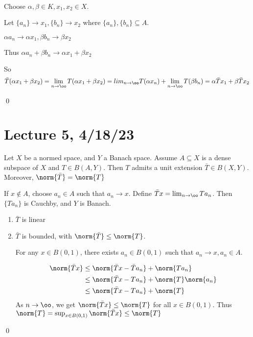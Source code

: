 \documentclass[x11names,reqno,14pt]{extarticle}
\begin{document}
\,

Choose $\alpha,\beta \in K, x_1, x_2 \in X$. 

Let $\{a_n\}\to x_1, \{b_n\}\to x_2$ where $\{a_n\},\{b_n\}\subseteq A$. 

$\alpha a_n \to \alpha x_1, \beta b_n \to \beta x_2$

Thus $\alpha a_n + \beta b_n \to \alpha x_1 + \beta x_2$

So
\[
\bar{T}(\alpha x_1 + \beta x_2) = \lim_{n\to\oo}T(\alpha x_1 + \beta x_2) = lim_{n\to\oo}T(\alpha x_n) + \lim_{n\to\oo}T(\beta b_n) = \alpha \bar{T}x_1 + \beta \bar{T}x_2
\]

\qed

\section*{Lecture 5, 4/18/23}

\thm Let $X$ be a normed space, and $Y$ a Banach space. Assume $A \subseteq X$ is a dense subspace of $X$ and $T \in B(A, Y)$. Then $T$ admits a unit extension $\bar{T}\in B(X, Y)$. Moreover, $\norm{\bar{T}} = \norm{T}$

\proof

If $x\not\in A$, choose $a_n \in A$ such that $a_n\to x$. Define $\bar{T}x =\lim_{n\to\oo}Ta_n$. Then $\{Ta_n\}$ is Cauchby, and $Y$ is Banach. 

\begin{enumerate}

\item $\bar{T}$ is linear

\item $\bar{T}$ is bounded, with $\norm{\bar{T}} \leq \norm{T}$. 

For any $x \in B(0, 1)$, there exists $a_n\in B(0, 1)$ such that $a_n\to x, a_n \in A$. 

\begin{align*}
\norm{\bar{T}x}& \leq \norm{\bar{T}x - \bar{T}a_n} + \norm{Ta_n} \\ 
& \leq \norm{\bar{T}x - Ta_n} + \norm{T}\norm{a_n} \\
& \leq \norm{\bar{T}x - Ta_n} + \norm{T} 
\end{align*}
As $n\to\oo$, we get $\norm{\bar{T}x} \leq \norm{T}$ for all $x \in B(0, 1)$. Thus $\norm{T} = \sup_{x\in B(0, 1)}\norm{\bar{T}x} \leq \norm{T}$


\end{enumerate}

\qed

\thm
\end{document}
